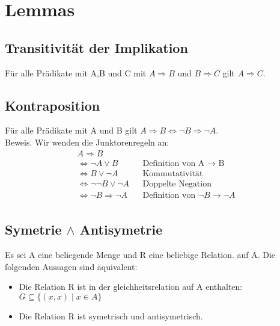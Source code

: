 \section{Lemmas}
\subsection{Transitivität der Implikation}
Für alle Prädikate mit A,B und C mit \(A \Rightarrow B\) und \(B \Rightarrow C\) gilt \(A \Rightarrow C\).
\subsection{Kontraposition}
Für alle Prädikate mit A und B gilt \(A \Rightarrow B \Leftrightarrow \neg B \Rightarrow \neg A\).\\
Beweis. Wir wenden die Junktorenregeln an:\\
\begin{align*}
    A \Rightarrow B \\
    \Leftrightarrow \neg A \vee B && \text{Definition von A $\rightarrow$ B}\\
    \Leftrightarrow B \vee \neg A && \text{Kommutativität}\\
    \Leftrightarrow \neg\neg B \vee \neg A && \text{Doppelte Negation}\\
    \Leftrightarrow \neg B \Rightarrow \neg A && \text{Definition von $\neg B \rightarrow \neg A$}\\
\end{align*}
\subsection{Symetrie $\wedge$ Antisymetrie}
Es sei A eine beliegende Menge und R eine beliebige Relation. auf A. Die folgenden Aussagen sind äquivalent:\\
\begin{itemize}
    \item Die Relation R ist in der gleichheitsrelation auf A enthalten:\\ $G \subseteq \{(x,x) \mid x \in A\}$
    \item Die Relation R ist symetrisch und antisymetrisch.
\end{itemize}